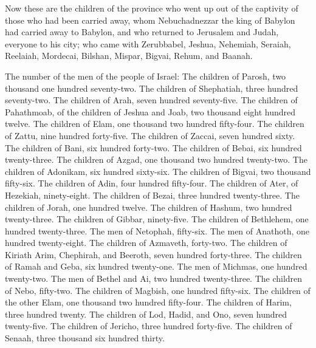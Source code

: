  Now these are the children of the province who went up out
of the captivity of those who had been carried away, whom Nebuchadnezzar
the king of Babylon had carried away to Babylon, and who returned to
Jerusalem and Judah, everyone to his city;  who came with
Zerubbabel, Jeshua, Nehemiah, Seraiah, Reelaiah, Mordecai, Bilshan,
Mispar, Bigvai, Rehum, and Baanah.

The number of the men of the people of Israel:  The children
of Parosh, two thousand one hundred seventy-two.  The
children of Shephatiah, three hundred seventy-two.  The
children of Arah, seven hundred seventy-five.  The children
of Pahathmoab, of the children of Jeshua and Joab, two thousand eight
hundred twelve.  The children of Elam, one thousand two
hundred fifty-four.  The children of Zattu, nine hundred
forty-five.  The children of Zaccai, seven hundred sixty.
 The children of Bani, six hundred forty-two. 
The children of Bebai, six hundred twenty-three.  The
children of Azgad, one thousand two hundred twenty-two. 
The children of Adonikam, six hundred sixty-six.  The
children of Bigvai, two thousand fifty-six.  The children
of Adin, four hundred fifty-four.  The children of Ater, of
Hezekiah, ninety-eight.  The children of Bezai, three
hundred twenty-three.  The children of Jorah, one hundred
twelve.  The children of Hashum, two hundred twenty-three.
 The children of Gibbar, ninety-five.  The
children of Bethlehem, one hundred twenty-three.  The men
of Netophah, fifty-six.  The men of Anathoth, one hundred
twenty-eight.  The children of Azmaveth, forty-two.
 The children of Kiriath Arim, Chephirah, and Beeroth,
seven hundred forty-three.  The children of Ramah and Geba,
six hundred twenty-one.  The men of Michmas, one hundred
twenty-two.  The men of Bethel and Ai, two hundred
twenty-three.  The children of Nebo, fifty-two.
 The children of Magbish, one hundred fifty-six.
 The children of the other Elam, one thousand two hundred
fifty-four.  The children of Harim, three hundred twenty.
 The children of Lod, Hadid, and Ono, seven hundred
twenty-five.  The children of Jericho, three hundred
forty-five.  The children of Senaah, three thousand six
hundred thirty.


